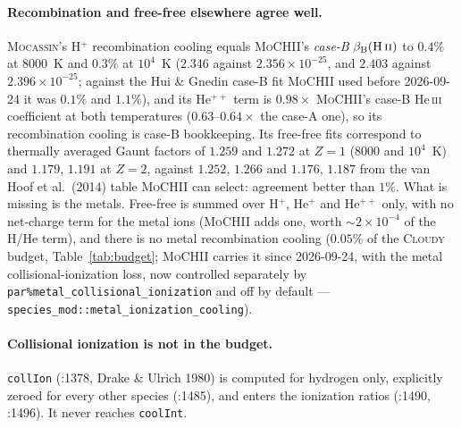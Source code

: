 \documentclass[english,a4paper]{my_memo}
\newcommand{\code}[1]{\texttt{#1}}
\newcommand{\MoCHII}{\textsc{MoCHII}}
\newcommand{\Cloudy}{\textsc{Cloudy}}
\newcommand{\Mocassin}{\textsc{Mocassin}}
\newcommand{\HeIII}{He\,\textsc{iii}}
\begin{document}
\paragraph{Recombination and free-free elsewhere agree well.}  \Mocassin{}'s
H$^{+}$ recombination cooling equals \MoCHII{}'s \emph{case-B} $\beta_{\rm
B}({\rm H\,\textsc{ii}})$ to $0.4\%$ at 8000~K and $0.3\%$ at $10^4$~K
($2.346$ against $2.356\times10^{-25}$, and $2.403$ against
$2.396\times10^{-25}$; against the Hui \& Gnedin case-B fit \MoCHII{} used
before 2026-09-24 it was $0.1\%$ and $1.1\%$), and its He$^{++}$ term is
$0.98\times$ \MoCHII{}'s case-B \HeIII{} coefficient at both temperatures
($0.63$--$0.64\times$ the case-A one), so its recombination cooling is case-B
bookkeeping.  Its free-free fits correspond to
thermally averaged Gaunt factors of $1.259$ and $1.272$ at $Z = 1$ (8000 and
$10^4$~K) and $1.179$, $1.191$ at $Z = 2$, against $1.252$, $1.266$ and
$1.176$, $1.187$ from the van Hoof et al.\ (2014) table \MoCHII{} can select:
agreement better than $1\%$.  What is missing is the metals.  Free-free is
summed over H$^{+}$, He$^{+}$ and He$^{++}$ only, with no net-charge term for
the metal ions (\MoCHII{} adds one, worth $\sim2\times10^{-4}$ of the H/He
term), and there is no metal recombination cooling ($0.05\%$ of the \Cloudy{}
budget, Table~\ref{tab:budget}; \MoCHII{} carries it since 2026-09-24, with the
metal collisional-ionization loss, now controlled separately by
\code{par\%metal\_collisional\_ionization} and off by default ---
\code{species\_mod::\allowbreak metal\_ionization\_cooling}).

\paragraph{Collisional ionization is not in the budget.}  \code{collIon}
(:1378, Drake \& Ulrich 1980) is computed for hydrogen only, explicitly zeroed
for every other species (:1485), and enters the ionization ratios (:1490,
:1496).  It never reaches \code{coolInt}.
\end{document}
